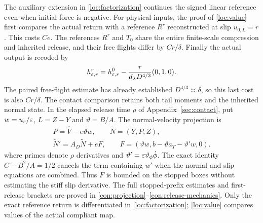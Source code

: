The auxiliary extension in \eqref{loc:factorization} continues the
signed linear reference even when initial force is negative.
For physical inputs, the proof of \eqref{loc:value} first compares the
actual return with a reference $R^r$ reconstructed at slip
$u_{0,L}=r$. This costs $Ce$. The references $R^r$ and $T_0$ share
the entire finite-scale compression and inherited release, and their
free flights differ by $Cr/\delta$. Finally the actual output is
recoded by
\[
 h_{\varepsilon,r}^r=h_{\varepsilon,r}^0-
                  \frac{r}{d_\lambda D^{4/3}}(0,1,0).
\]
The paired free-flight estimate has already established
$D^{4/3}\asymp\delta$, so this last cost is also $Cr/\delta$.
The contact comparison retains both tail moments and the inherited
normal state. In the elapsed release time $\rho$ of
Appendix~\ref{sec:contact}, put $w=u_r/\varepsilon$, $L=Z-Y$ and
$\vartheta=B/A$. The normal-velocity projection is
\[
 \begin{gathered}
 P=\widehat V-e\vartheta w,\qquad \widetilde N=(Y,P,Z),\\
 \widetilde N'=A_D\widetilde N+eF,\qquad
 F=(\vartheta w,b-\vartheta a_T-\vartheta'w,0).
 \end{gathered}
\]
where primes denote $\rho$ derivatives and
$\vartheta'=\varepsilon\vartheta_\phi\dot\phi$.
The exact identity $C-B^2/A=1/2$ cancels the term containing $w'$
when the normal and slip equations are combined. Thus $F$ is bounded
on the stopped boxes without estimating the stiff slip derivative.
The full stopped-prefix estimates and first-release brackets are
proved in \eqref{con:projection}--\eqref{con:release-mechanics}.
Only the exact reference return is differentiated in
\eqref{loc:factorization}; \eqref{loc:value} compares values of the
actual compliant map.

